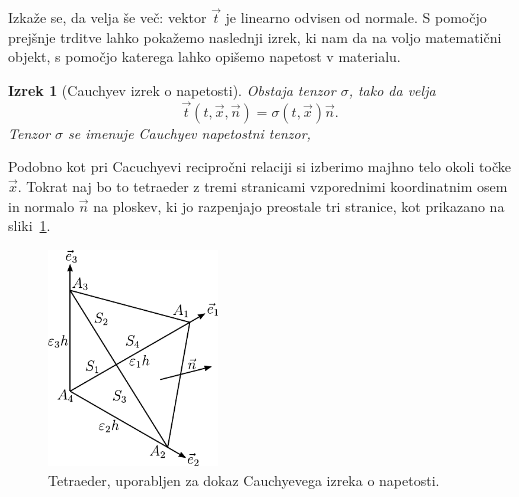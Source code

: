 \documentclass[12pt,a4paper]{article}
\theoremstyle{definition} %
\theoremstyle{plain} %
\newtheorem{izrek}[definicija]{Izrek}
\numberwithin{equation}{section}
\newcommand{\vt}{\vec{t}}
\newcommand{\vn}{\vec{n}}
\newcommand{\vx}{\vec{x}}
\newcommand{\ts}{\sigma}
\begin{document}
Izkaže se, da velja še več: vektor $\vt$ je linearno odvisen od normale. S
pomočjo prejšnje trditve lahko pokažemo naslednji izrek, ki nam da na voljo
matematični objekt, s pomočjo katerega lahko opišemo napetost v materialu.
\begin{izrek}[Cauchyev izrek o napetosti]
  Obstaja tenzor $\ts$, tako da velja \[
    \vt(t, \vx, \vn) = \ts(t, \vx)\vn.
  \]
  Tenzor $\ts$ se imenuje Cauchyev napetostni tenzor,
\end{izrek}
\proof
Podobno kot pri Cacuchyevi recipročni relaciji si izberimo majhno telo okoli
točke $\vx$. Tokrat naj bo to tetraeder z tremi stranicami vzporednimi
koordinatnim osem in normalo $\vn$ na ploskev, ki jo razpenjajo preostale tri
stranice, kot prikazano na sliki~\ref{fig:tetra}.

\begin{figure}[h]
  \centering
  \includegraphics[width=0.4\textwidth]{images/cauchy_tetrahedron.pdf}
  \caption{Tetraeder, uporabljen za dokaz Cauchyevega izreka o napetosti.}
  \label{fig:tetra}
\end{figure}
\end{document}
